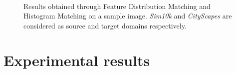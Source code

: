 \documentclass[%
    corpo=12pt,
    twoside,
    stile=classica,   
    tipotesi=magistrale,
    evenboxes,
    english,
	numerazioneromana,
]{toptesi}
\begin{document}
\begin{figure}[ht!]
	\centering
	\\
	\caption{Results obtained through Feature Distribution Matching and Histogram Matching on a sample image. \textit{Sim10k} and \textit{CityScapes} are considered as source and target domains respectively.}
	\label{fig:kis}
\end{figure}



\chapter{Experimental results}
\end{document}
